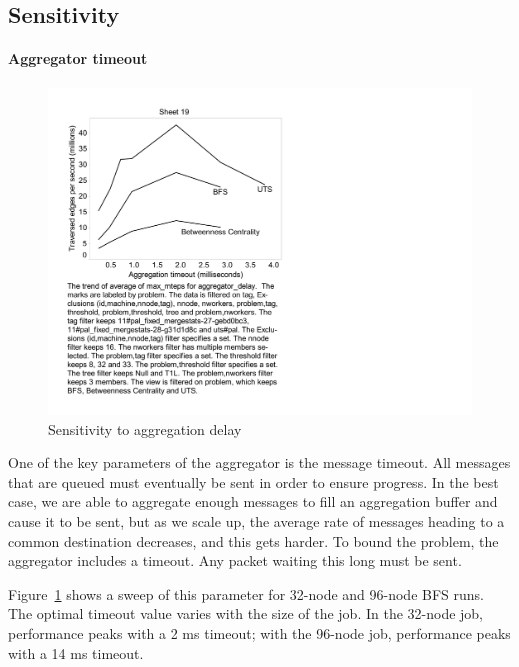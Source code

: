 \subsection{Sensitivity}

\paragraph{Aggregator timeout}

\begin{figure}[htb]
\begin{center}
  \includegraphics[width=0.95\columnwidth]{figs/flushticks_sweep}
\begin{minipage}{0.95\columnwidth}
  \caption{\label{fig:bfs-sweep-flushticks} Sensitivity to aggregation delay}
\end{minipage}
\vspace{-3ex}
\end{center}
\end{figure}


One of the key parameters of the aggregator is the message
timeout. All messages that are queued must eventually be sent in order
to ensure progress. In the best case, we are able to aggregate enough
messages to fill an aggregation buffer and cause it to be sent, but as
we scale up, the average rate of messages heading to a common
destination decreases, and this gets harder. To bound the problem, the
aggregator includes a timeout. Any packet waiting this long must be sent.

Figure~\ref{fig:bfs-sweep-flushticks} shows a sweep of this parameter
for 32-node and 96-node BFS runs. The optimal timeout value varies
with the size of the job. In the 32-node job, performance peaks with a
2 ms timeout; with the 96-node job, performance peaks with a 14 ms
timeout.

